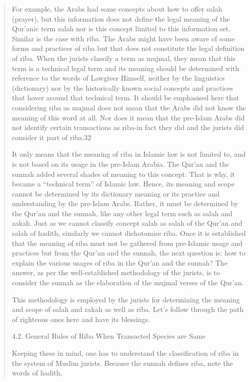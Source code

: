 \begin{quote}
For example, the Arabs had some concepts about how to offer salah (prayer), but this information does not define the legal meaning of the Qur'anic term salah nor is this concept limited to this information set. Similar is the case with riba. The Arabs might have been aware of some forms and practices of riba but that does not constitute the legal definition of riba. When the jurists classify a term as mujmal, they mean that this term is a technical legal term and its meaning should be determined with reference to the words of Lawgiver Himself, neither by the linguistics (dictionary) nor by the historically known social concepts and practices that hover around that technical term. It should be emphasised here that considering riba as mujmal does not mean that the Arabs did not know the meaning of this word at all. Nor does it mean that the pre-Islam Arabs did not identify certain transactions as riba-in fact they did and the jurists did consider it part of riba.32

It only means that the meaning of riba in Islamic law is not limited to, and is not based on its usage in the pre-Islam Arabia. The Qur'an and the sunnah added several shades of meaning to this concept. That is why, it became a “technical term” of Islamic law. Hence, its meaning and scope cannot be determined by its dictionary meaning or its practice and understanding by the pre-Islam Arabs. Rather, it must be determined by the Qur'an and the sunnah, like any other legal term such as salah and zakah. Just as we cannot classify concept salah as salah of the Qur'an and salah of hadith, similarly we cannot dichotomise riba. Once it is established that the meaning of riba must not be gathered from pre-Islamic usage and practices but from the Qur'an and the sunnah, the next question is: how to explain the various usages of riba in the Qur'an and the sunnah? The answer, as per the well-established methodology of the jurists, is to consider the sunnah as the elaboration of the mujmal verses of the Qur'an.

This methodology is employed by the jurists for determining the meaning and scope of salah and zakah as well as riba. Let's follow through the path of righteous ones here and have its blessings.

4.2. General Rules of Riba When Transacted Species are Same

Keeping these in mind, one has to understand the classification of riba in the system of Muslim jurists. Because the sunnah defines riba, note the words of hadith,


\end{quote}
